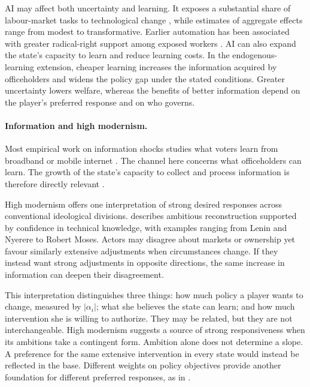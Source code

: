 \documentclass[12pt,letterpaper]{article}
\begin{document}
AI may affect both uncertainty and learning. It exposes a substantial share of labour-market tasks to technological change \citep{Eloundou2024}, while estimates of aggregate effects range from modest \citep{Acemoglu2025} to transformative. Earlier automation has been associated with greater radical-right support among exposed workers \citep{Frey2018,Anelli2021}. AI can also expand the state's capacity to learn \citep{Engstrom2020} and reduce learning costs. In the endogenous-learning extension, cheaper learning increases the information acquired by officeholders and widens the policy gap under the stated conditions. Greater uncertainty lowers welfare, whereas the benefits of better information depend on the player's preferred response and on who governs.

\paragraph{Information and high modernism.}
Most empirical work on information shocks studies what voters learn from broadband or mobile internet \citep{Falck2014,Campante2018,Guriev2021,Zhuravskaya2020}. The channel here concerns what officeholders can learn. The growth of the state's capacity to collect and process information is therefore directly relevant \citep{Brambor2020}.

High modernism offers one interpretation of strong desired responses across conventional ideological divisions. \citet{Scott1998} describes ambitious reconstruction supported by confidence in technical knowledge, with examples ranging from Lenin and Nyerere to Robert Moses. Actors may disagree about markets or ownership yet favour similarly extensive adjustments when circumstances change. If they instead want strong adjustments in opposite directions, the same increase in information can deepen their disagreement.

This interpretation distinguishes three things: how much policy a player wants to change, measured by $|\alpha_i|$; what she believes the state can learn; and how much intervention she is willing to authorize. They may be related, but they are not interchangeable. High modernism suggests a source of strong responsiveness when its ambitions take a contingent form. Ambition alone does not determine a slope. A preference for the same extensive intervention in every state would instead be reflected in the base. Different weights on policy objectives provide another foundation for different preferred responses, as in \citet{Rogoff1985}.
\end{document}

